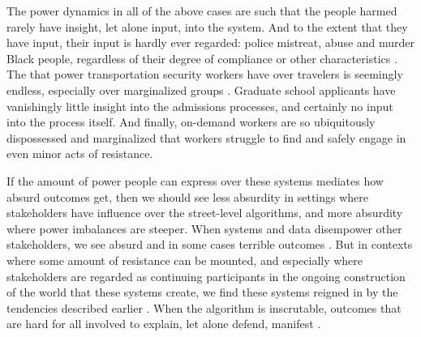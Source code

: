 \documentclass[manuscript,screen]{acmart}
\begin{document}
The power dynamics in all of the above cases are such that the people harmed rarely have insight, let alone input, into the system.
And to the extent that they have input, their input is hardly ever regarded: police mistreat, abuse and murder Black people, regardless of their degree of compliance or other characteristics
\cite{moore2018critical}.
The that power transportation security workers have over travelers is seemingly endless, especially over marginalized groups
\cite{chapablanco2018traveling}.
Graduate school applicants have vanishingly little insight into the admissions processes, and certainly no input into the process itself.
And finally, on-demand workers are so ubiquitously dispossessed and marginalized that workers struggle to find and safely engage in even minor acts of resistance.

If the amount of power people can express over these systems mediates how absurd outcomes get, then we should see less absurdity in settings where stakeholders have influence over the street-level algorithms, and more absurdity where power imbalances are steeper.
When systems and data disempower other stakeholders, we see absurd and in some cases terrible outcomes
\cite{Bopp:2017:DDN:3025453.3025694}.
But in contexts where some amount of resistance can be mounted, and especially where stakeholders are regarded as continuing participants in the ongoing construction of the world that these systems create, we find these systems reigned in by the tendencies described earlier
\cite{doi:10.1177/2053951717718855}.
When the algorithm is inscrutable, outcomes that are hard for all involved to explain, let alone defend, manifest
\cite{streetLevelAlgorithms,LGBTYouTube,ibrahim2010breastfeeding,adpocalypseForbes}.
\end{document}
